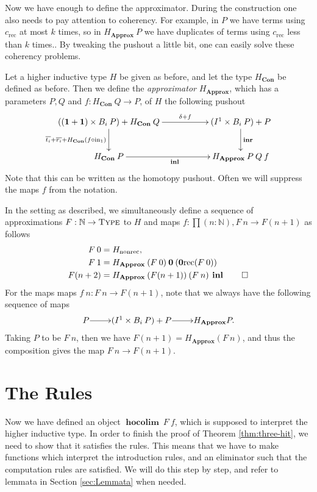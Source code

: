 \documentclass[a4paper,UKenglish]{lipics-v2016}
\newcommand{\inn}{{\rm in}}
\newcommand{\zero}[0]{\textbf{0}}
\newcommand{\one}[0]{\textbf{1}}
\newcommand{\frec}[0]{\!\operatorname{rec}}
\newcommand{\rec}[0]{\operatorname{rec}}
\newcommand{\nonrec}[0]{\operatorname{nonrec}}
\newcommand{\Con}[0]{\textbf{Con}}
\newcommand{\Approx}[0]{\textbf{Approx}}
\newcommand{\hocolim}[0]{\operatorname{\textbf{hocolim}}}
\newcommand{\inl}[0]{\operatorname{\textbf{inl}}}
\newcommand{\inr}[0]{\operatorname{\textbf{inr}}}
\newcommand{\Type}[0]{\operatorname{\textsc{Type}}}
\begin{document}
Now we have enough to define the approximator.
During the construction one also needs to pay attention to coherency.
For example, in $P$ we have terms using $c_{\rec}$ at most $k$ times, so in $H_{\Approx} \> P$ we have duplicates of terms using $c_{\rec}$ less than $k$ times..
By tweaking the pushout a little bit, one can easily solve these coherency problems.

\begin{definition}
Let a higher inductive type $H$ be given as before, and let the type $H_{\Con}$ be defined as before.
Then we define the \emph{approximator} $H_{\Approx}$, which has a parameters $P, Q$ and $f : H_{\Con} \> Q \rightarrow P$, of $H$ the following pushout
\[
\xymatrix
{
	((\one + \one) \times B_i \> P) + H_{\Con} \> Q \ar[d]_{\overline{t_i} + \overline{r_i} + H_{\Con}(f \circ \inn_1)} \ar[rr]^-{\delta + f} & & (I^1 \times B_i \> P) + P  \ar[d]^{\inr}\\
	H_{\Con} \> P \ar[rr]_{\inl} & & H_{\Approx} \> P \> Q \> f
}
\]
Note that this can be written as the homotopy pushout.
Often we will suppress the maps $f$ from the notation.
\end{definition}

\begin{definition}
In the setting as described, we simultaneously define a sequence of approximations $F : \mathbb{N} \rightarrow \Type$ to $H$ and maps $f : \prod(n : \mathbb{N}), F \> n \rightarrow F(n+1)$ as follows
\begin{align*}
F \> 0 &= H_{\nonrec},\\
F \> 1 &= H_{\Approx} \> (F \> 0) \> \zero \> (\zero\frec (F \> 0))\\
F(n+2) &= H_{\Approx} \> (F(n+1)) \> (F \> n) \> \inl \qedhere
\end{align*}
For the maps maps $f \> n : F \> n \rightarrow F(n + 1)$, note that we always have the following sequence of maps
\[
\xymatrix@1
{
	P \ar[r] & (I^1 \times B_i \> P) + P \ar[r] & H_{\Approx} P.
}
\]
Taking $P$ to be $F \> n$, then we have $F (n+1) = H_{\Approx} (F \> n)$, and thus the composition gives the map $F \> n \rightarrow F(n + 1)$.
\end{definition}

\section{The Rules}
\label{sec:rules}
Now we have defined an object $\hocolim \> F \> f$, which is supposed to interpret the higher inductive type.
In order to finish the proof of Theorem \ref{thm:three-hit}, we need to show that it satisfies the rules.
This means that we have to make functions which interpret the introduction rules, and an eliminator such that the computation rules are satisfied.
We will do this step by step, and refer to lemmata in Section \ref{sec:Lemmata} when needed.
\end{document}

